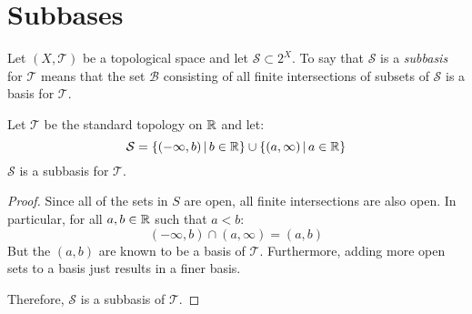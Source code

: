 \documentclass[letterpaper,12pt,fleqn]{article}
\newcommand{\T}{\mathscr{T}}
\renewcommand{\S}{\mathcal{S}}
\newcommand{\B}{\mathcal{B}}
\begin{document}
\section*{Subbases}

\begin{definition}[Subbasis]
  Let \((X,\T)\) be a topological space and let \(\S\subset2^X\).  To say that \(\S\) is a \emph{subbasis} for \(\T\)
  means that the set \(\B\) consisting of all finite intersections of subsets of \(\S\) is a basis for \(\T\).
\end{definition}

\begin{theorem}
  Let \(\T\) be the standard topology on \(\mathbb{R}\) and let:
  \[\S=\setb{(-\infty,b)}{b\in\R}\cup\setb{(a,\infty)}{a\in\R}\]
  \(\S\) is a subbasis for \(\T\).
\end{theorem}

\begin{proof}
  Since all of the sets in \(S\) are open, all finite intersections are also open.  In particular, for all
  \(a,b\in\mathbb{R}\) such that \(a<b\):
  \[(-\infty,b)\cap(a,\infty)=(a,b)\]
  But the \((a,b)\) are known to be a basis of \(\T\).  Furthermore, adding more open sets to a basis just results
  in a finer basis.

  Therefore, \(\S\) is a subbasis of \(\T\).
\end{proof}
\end{document}

